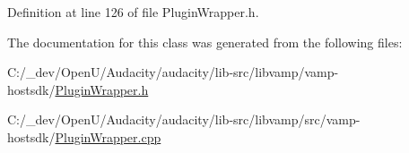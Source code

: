 Definition at line 126 of file Plugin\+Wrapper.\+h.



The documentation for this class was generated from the following files\+:\begin{DoxyCompactItemize}
\item 
C\+:/\+\_\+dev/\+Open\+U/\+Audacity/audacity/lib-\/src/libvamp/vamp-\/hostsdk/\hyperlink{_plugin_wrapper_8h}{Plugin\+Wrapper.\+h}\item 
C\+:/\+\_\+dev/\+Open\+U/\+Audacity/audacity/lib-\/src/libvamp/src/vamp-\/hostsdk/\hyperlink{_plugin_wrapper_8cpp}{Plugin\+Wrapper.\+cpp}\end{DoxyCompactItemize}
